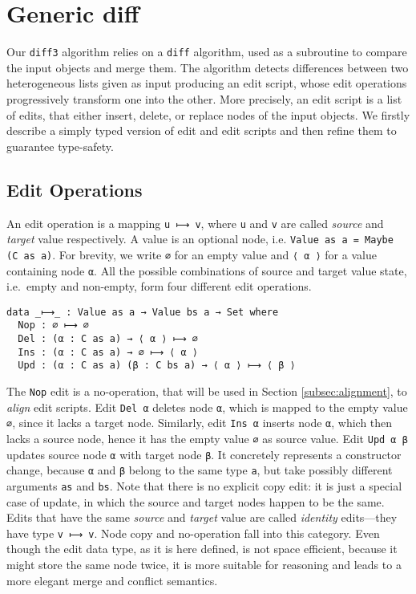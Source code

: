 \documentclass{sigplanconf}
\theoremstyle{plain}
\begin{document}
\section{Generic diff}
\label{sec:generic-diff}
Our \texttt{diff3} algorithm relies on a \texttt{diff} algorithm, used
as a subroutine to compare the input objects and merge them.
%
The algorithm detects differences between two heterogeneous lists
given as input producing an edit script, whose edit operations
progressively transform one into the other.
%
More precisely, an edit script is a list of edits, that either insert,
delete, or replace nodes of the input objects.
%
We firstly describe a simply typed version of edit and edit scripts
and then refine them to guarantee type-safety.

\subsection{Edit Operations}
An edit operation is a mapping \texttt{u ⟼ v}, where \texttt{u} and
\texttt{v} are called \emph{source} and \emph{target} value
respectively.
%
A value is an optional node, i.e.  \texttt{Value as a = Maybe (C as
  a)}. 
%
For brevity, we write \texttt{∅} for an empty value and \texttt{⟨ α ⟩}
for a value containing node \texttt{α}.
% 
All the possible combinations of source and target value state, i.e.\
empty and non-empty, form four different edit operations.
\begin{verbatim}
data _⟼_ : Value as a → Value bs a → Set where
  Nop : ∅ ⟼ ∅
  Del : (α : C as a) → ⟨ α ⟩ ⟼ ∅
  Ins : (α : C as a) → ∅ ⟼ ⟨ α ⟩
  Upd : (α : C as a) (β : C bs a) → ⟨ α ⟩ ⟼ ⟨ β ⟩
\end{verbatim}
The \texttt{Nop} edit is a no-operation, that will be
used in Section \ref{subsec:alignment}, to \emph{align} edit scripts.
%
Edit \texttt{Del α} deletes node \texttt{α}, which is mapped to
the empty value \texttt{∅}, since it lacks a target node.
%
Similarly, edit \texttt{Ins α} inserts node \texttt{α}, which
then lacks a source node, hence it has the empty value \texttt{∅} 
as source value.
%
Edit \texttt{Upd α β} updates source node \texttt{α} with target node
\texttt{β}.
%
It concretely represents a constructor change, because \texttt{α} and
\texttt{β} belong to the same type \texttt{a}, but take possibly
different arguments \texttt{as} and \texttt{bs}.
%
Note that there is no explicit copy edit: it is just a special case of
update, in which the source and target nodes happen to be the same.
%
Edits that have the same \emph{source} and \emph{target} value are
called \emph{identity} edits---they have type \texttt{v
  ⟼ v}.
%
Node copy and no-operation fall into this category.
%
Even though the edit data type, as it is here defined, is not space
efficient, because it might store the same node twice, it is more
suitable for reasoning and leads to a more elegant merge and conflict
semantics.
%
	
\end{document}
